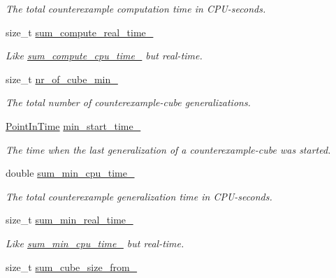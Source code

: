 \begin{DoxyCompactItemize}
\begin{DoxyCompactList}\small\item\em The total counterexample computation time in C\-P\-U-\/seconds. \end{DoxyCompactList}\item 
size\-\_\-t \hyperlink{classLearnStatisticsQBF_aceb8e32bfd42839f2c19d3b12e7eb888}{sum\-\_\-compute\-\_\-real\-\_\-time\-\_\-}
\begin{DoxyCompactList}\small\item\em Like \hyperlink{classLearnStatisticsQBF_a4caf75f422eed77570e5592ce35c9bd0}{sum\-\_\-compute\-\_\-cpu\-\_\-time\-\_\-} but real-\/time. \end{DoxyCompactList}\item 
size\-\_\-t \hyperlink{classLearnStatisticsQBF_aff417981063fbdf94164ce7b2d1e71a2}{nr\-\_\-of\-\_\-cube\-\_\-min\-\_\-}
\begin{DoxyCompactList}\small\item\em The total number of counterexample-\/cube generalizations. \end{DoxyCompactList}\item 
\hyperlink{Options_8h_af3a9f634f27bed7e98dbc23e5c6f807d}{Point\-In\-Time} \hyperlink{classLearnStatisticsQBF_a929ae751d1bbb728f96132e5ee6d99fa}{min\-\_\-start\-\_\-time\-\_\-}
\begin{DoxyCompactList}\small\item\em The time when the last generalization of a counterexample-\/cube was started. \end{DoxyCompactList}\item 
double \hyperlink{classLearnStatisticsQBF_a8fcce1bc5593631429c86bd3a1376e86}{sum\-\_\-min\-\_\-cpu\-\_\-time\-\_\-}
\begin{DoxyCompactList}\small\item\em The total counterexample generalization time in C\-P\-U-\/seconds. \end{DoxyCompactList}\item 
size\-\_\-t \hyperlink{classLearnStatisticsQBF_a6aded3992cd822a0ca45bc2d6658a5ab}{sum\-\_\-min\-\_\-real\-\_\-time\-\_\-}
\begin{DoxyCompactList}\small\item\em Like \hyperlink{classLearnStatisticsQBF_a8fcce1bc5593631429c86bd3a1376e86}{sum\-\_\-min\-\_\-cpu\-\_\-time\-\_\-} but real-\/time. \end{DoxyCompactList}\item 
size\-\_\-t \hyperlink{classLearnStatisticsQBF_a46277893a5465fb97805624e1ac31f38}{sum\-\_\-cube\-\_\-size\-\_\-from\-\_\-}

\end{DoxyCompactItemize}
